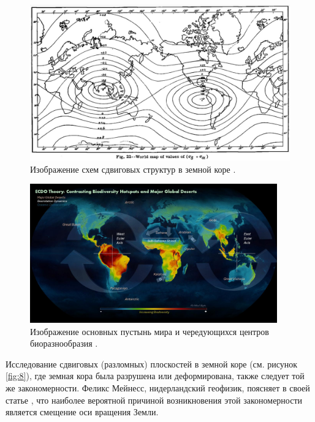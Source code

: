 \documentclass[10pt,twocolumn,letterpaper]{article}
\begin{document}
\begin{figure}[t]
\begin{center}
   \includegraphics[width=1\linewidth]{meinesz3.jpg}
\end{center}
   \caption{Изображение схем сдвиговых структур в земной коре \cite{36}.}
\label{fig:8}
\label{fig:onecol}
\end{figure}
\begin{figure}[t]
\begin{center}
\includegraphics[width=0.95\textwidth]{biodiversity.jpg}
\end{center}
   \caption{Изображение основных пустынь мира и чередующихся центров биоразнообразия \cite{28}.}
\label{fig:9}
\end{figure}

Исследование сдвиговых (разломных) плоскостей в земной коре (см. рисунок \ref{fig:8}), где земная кора была разрушена или деформирована, также следует той же закономерности. Феликс Мейнесс, нидерландский геофизик, поясняет в своей статье \cite{36}, что наиболее вероятной причиной возникновения этой закономерности является смещение оси вращения Земли.
\end{document}
